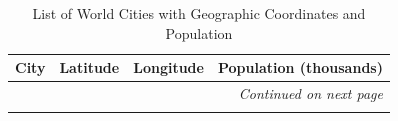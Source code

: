 

\begin{longtable}{lrrc}
\caption{List of World Cities with Geographic Coordinates and Population} \label{tab:world-cities} \\
\toprule
\textbf{City} & \textbf{Latitude} & \textbf{Longitude} & \textbf{Population (thousands)} \\
\midrule
\endhead

\midrule
\multicolumn{4}{r}{\footnotesize\textit{Continued on next page}} \\
\endfoot

\bottomrule
\endlastfoot


\end{longtable}
